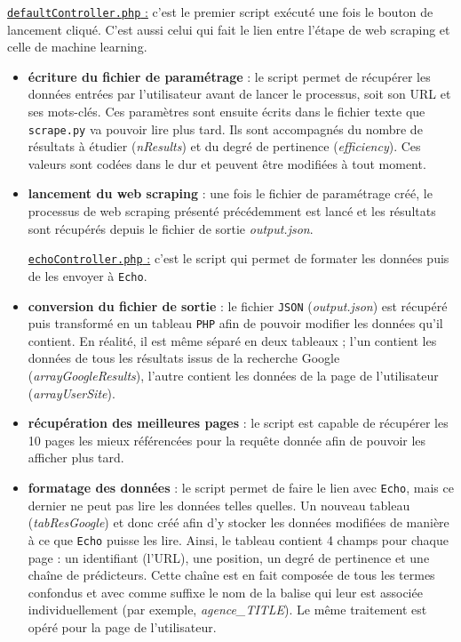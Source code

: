 \documentclass[12pt]{article}
\begin{document}
\newpage
\underline{\texttt{defaultController.php} :} c'est le premier script exécuté une fois le bouton de lancement cliqué. C'est aussi celui qui fait le lien entre l'étape de web scraping et celle de machine learning.
\begin{itemize}
	\item \textbf{écriture du fichier de paramétrage} : le script permet de récupérer les données entrées par l'utilisateur avant de lancer le processus, soit son URL et ses mots-clés. Ces paramètres sont ensuite écrits dans le fichier texte que \texttt{scrape.py} va pouvoir lire plus tard. Ils sont accompagnés du nombre de résultats à étudier (\textit{nResults}) et du degré de pertinence (\textit{efficiency}). Ces valeurs sont codées dans le dur et peuvent être modifiées à tout moment.
	\item \textbf{lancement du web scraping} : une fois le fichier de paramétrage créé, le processus de web scraping présenté précédemment est lancé et les résultats sont récupérés depuis le fichier de sortie \textit{output.json}.
	
\newpage
\underline{\texttt{echoController.php} :} c'est le script qui permet de formater les données puis de les envoyer à \texttt{Echo}.
	\item \textbf{conversion du fichier de sortie} : le fichier \texttt{JSON} (\textit{output.json}) est récupéré puis transformé en un tableau \texttt{PHP} afin de pouvoir modifier les données qu'il contient. En réalité, il est même séparé en deux tableaux ; l'un contient les données de tous les résultats issus de la recherche Google (\textit{arrayGoogleResults}), l'autre contient les données de la page de l'utilisateur (\textit{arrayUserSite}).
	
	\item \textbf{récupération des meilleures pages} : le script est capable de récupérer les 10 pages les mieux référencées pour la requête donnée afin de pouvoir les afficher plus tard.
	
	\item \textbf{formatage des données} : le script permet de faire le lien avec \texttt{Echo}, mais ce dernier ne peut pas lire les données telles quelles. Un nouveau tableau (\textit{tabResGoogle}) et donc créé afin d'y stocker les données modifiées de manière à ce que \texttt{Echo} puisse les lire. Ainsi, le tableau contient 4 champs pour chaque page : un identifiant (l'URL), une position, un degré de pertinence et une chaîne de prédicteurs. Cette chaîne est en fait composée de tous les termes confondus et avec comme suffixe le nom de la balise qui leur est associée individuellement (par exemple, \textit{agence\_TITLE}). Le même traitement est opéré pour la page de l'utilisateur.
	

\end{itemize}
\end{document}
